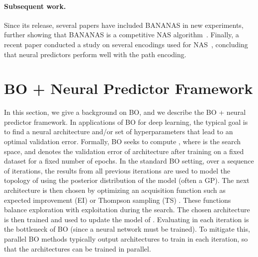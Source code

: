 \documentclass[11pt]{article}
\numberwithin{equation}{section}
\numberwithin{figure}{section}
\theoremstyle{plain}
\theoremstyle{definition}
\newcounter{Frame}
\let\citep\cite
\begin{document}
\paragraph{Subsequent work.}
Since its release, several papers have included BANANAS in new experiments,
further showing that BANANAS is a competitive NAS 
algorithm~\citep{remaade, nasbench301,nguyen2020optimal, nasbowl, npenas}.
Finally, a recent paper conducted a study on several encodings used for 
NAS~\cite{white2020study}, concluding that neural predictors perform well
with the path encoding.

\begin{comment}
state of the art~\citep{remaade, nasbench301},
or second only to follow-up work~\citep{nguyen2020optimal, nasbowl, npenas}.
Notably, one paper~\citep{remaade} showed that BANANAS is state-of-the-art on NASBench-101
when given a budget of 3200 evaluations, and another paper~\citep{nasbench301} showed that
BANANAS is state-of-the-art on a new surrogate benchmark on the DARTS
search space.
Finally, 
a recent paper conducted a study on several encodings used for 
NAS~\cite{white2020study}, concluding that the path encoding,
even when truncated, is particularly well-suited for neural predictors.

\end{comment}

 
\section{BO + Neural Predictor Framework}
\label{sec:preliminaries}
In this section, we give a background on BO, and we describe the
BO + neural predictor framework.
In applications of BO for deep learning, the typical goal is to find a
neural architecture and/or set of hyperparameters that lead to
an optimal validation error. Formally, BO
seeks to compute , where  is
the search space, and 
denotes the validation error of architecture  after training
on a fixed dataset for a fixed number of epochs. In the standard 
BO setting,
over a sequence of iterations, the results from all previous iterations 
are used to model the topology of  using
the posterior distribution of the model (often a GP).
The next architecture is then chosen by optimizing an acquisition
function such as expected improvement (EI) \cite{movckus1975bayesian}
or Thompson sampling (TS) \cite{thompson1933likelihood}.
These functions balance exploration with exploitation during the search.
The chosen architecture is then trained and used to update the model of .
Evaluating  in each iteration is the bottleneck of BO 
(since a neural network must be trained). To mitigate this,
parallel BO methods typically output  architectures to
train in each iteration, so that the 
architectures can be trained in parallel.
\end{document}
